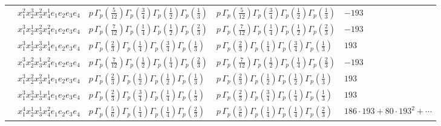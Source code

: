 \documentclass[11pt]{article}
\begin{document}
\begin{table}[ht]
{\begin{tabular}{@{}lllll@{}}
 & $x_{1}^{2} x_{2}^{3} x_{3}^{2} x_{4}^{1}  e_{1} e_{2} e_{3} e_{4}$ & $p \, \Gamma_p \left( \frac{5}{12} \right) \Gamma_p \left( \frac{3}{4} \right) \Gamma_p \left( \frac{1}{2} \right) \Gamma_p \left( \frac{1}{3} \right)$ & $p \, \Gamma_p \left( \frac{5}{12} \right) \Gamma_p \left( \frac{3}{4} \right) \Gamma_p \left( \frac{1}{2} \right) \Gamma_p \left( \frac{1}{3} \right)$ & $-193$ \\
 & $x_{1}^{3} x_{2}^{1} x_{3}^{2} x_{4}^{2}  e_{1} e_{2} e_{3} e_{4}$ & $p \, \Gamma_p \left( \frac{7}{12} \right) \Gamma_p \left( \frac{1}{4} \right) \Gamma_p \left( \frac{1}{2} \right) \Gamma_p \left( \frac{2}{3} \right)$ & $p \, \Gamma_p \left( \frac{7}{12} \right) \Gamma_p \left( \frac{1}{4} \right) \Gamma_p \left( \frac{1}{2} \right) \Gamma_p \left( \frac{2}{3} \right)$ & $-193$ \\
 & $x_{1}^{3} x_{2}^{1} x_{3}^{3} x_{4}^{1}  e_{1} e_{2} e_{3} e_{4}$ & $p \, \Gamma_p \left( \frac{2}{3} \right) \Gamma_p \left( \frac{1}{4} \right) \Gamma_p \left( \frac{3}{4} \right) \Gamma_p \left( \frac{1}{3} \right)$ & $p \, \Gamma_p \left( \frac{2}{3} \right) \Gamma_p \left( \frac{1}{4} \right) \Gamma_p \left( \frac{3}{4} \right) \Gamma_p \left( \frac{1}{3} \right)$ & $193$ \\
 & $x_{1}^{3} x_{2}^{2} x_{3}^{1} x_{4}^{2}  e_{1} e_{2} e_{3} e_{4}$ & $p \, \Gamma_p \left( \frac{7}{12} \right) \Gamma_p \left( \frac{1}{2} \right) \Gamma_p \left( \frac{1}{4} \right) \Gamma_p \left( \frac{2}{3} \right)$ & $p \, \Gamma_p \left( \frac{7}{12} \right) \Gamma_p \left( \frac{1}{2} \right) \Gamma_p \left( \frac{1}{4} \right) \Gamma_p \left( \frac{2}{3} \right)$ & $-193$ \\
 & $x_{1}^{3} x_{2}^{2} x_{3}^{2} x_{4}^{1}  e_{1} e_{2} e_{3} e_{4}$ & $p \, \Gamma_p \left( \frac{2}{3} \right) \Gamma_p \left( \frac{1}{2} \right) \Gamma_p \left( \frac{1}{2} \right) \Gamma_p \left( \frac{1}{3} \right)$ & $p \, \Gamma_p \left( \frac{2}{3} \right) \Gamma_p \left( \frac{1}{2} \right) \Gamma_p \left( \frac{1}{2} \right) \Gamma_p \left( \frac{1}{3} \right)$ & $193$ \\
 & $x_{1}^{3} x_{2}^{3} x_{3}^{1} x_{4}^{1}  e_{1} e_{2} e_{3} e_{4}$ & $p \, \Gamma_p \left( \frac{2}{3} \right) \Gamma_p \left( \frac{3}{4} \right) \Gamma_p \left( \frac{1}{4} \right) \Gamma_p \left( \frac{1}{3} \right)$ & $p \, \Gamma_p \left( \frac{2}{3} \right) \Gamma_p \left( \frac{3}{4} \right) \Gamma_p \left( \frac{1}{4} \right) \Gamma_p \left( \frac{1}{3} \right)$ & $193$ \\
 & $x_{1}^{4} x_{2}^{1} x_{3}^{1} x_{4}^{2}  e_{1} e_{2} e_{3} e_{4}$ & $p \, \Gamma_p \left( \frac{5}{6} \right) \Gamma_p \left( \frac{1}{4} \right) \Gamma_p \left( \frac{1}{4} \right) \Gamma_p \left( \frac{2}{3} \right)$ & $p \, \Gamma_p \left( \frac{5}{6} \right) \Gamma_p \left( \frac{1}{4} \right) \Gamma_p \left( \frac{1}{4} \right) \Gamma_p \left( \frac{2}{3} \right)$ & $186{\cdot}193{+}80{\cdot}193^{2}{+}\cdots$ \\

\end{tabular}}
\end{table}
\end{document}
